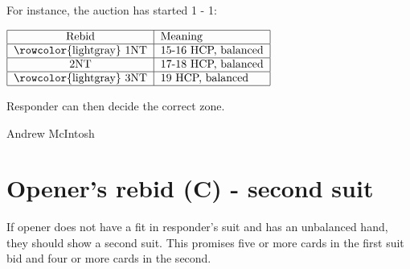 \documentclass[14pt]{extarticle}
\begin{document}
\noindent For instance, the auction has started 1\textcolor{ForestGreen}{} - 1\textcolor{red}{}:
\\
\begin{center}
$\begin{tabular}{|c|l|}
\hline
Rebid & Meaning\\
\hline
\rowcolor{lightgray}
1NT & 15-16 HCP, balanced\\
\hline
2NT &17-18 HCP, balanced\\
\hline
\rowcolor{lightgray}
3NT & 19 HCP, balanced\\
\hline
\end{tabular}$\\\end{center}
\vspace{0.15in}
\noindent Responder can then decide the correct zone.
\vspace*{\fill}
\begin{flushbottom}
 \begin{center}
 \tiny
 \textcopyright Andrew McIntosh
\end{center}
\end{flushbottom}




\vspace*{\fill}
\begingroup
\centering

\section*{Opener's rebid (C) - second suit}
\endgroup
\noindent If opener does not have a fit in responder's suit and has an unbalanced hand, they should show a second suit. This promises five or more cards in the first suit bid and four or more cards in the second. \\
%
\end{document}
